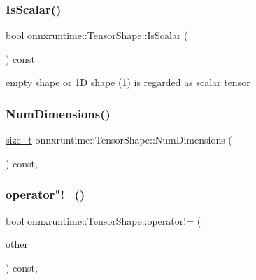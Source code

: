 \subsubsection{\texorpdfstring{Is\+Scalar()}{IsScalar()}}
{\footnotesize\ttfamily bool onnxruntime\+::\+Tensor\+Shape\+::\+Is\+Scalar (\begin{DoxyParamCaption}{ }\end{DoxyParamCaption}) const\hspace{0.3cm}{\ttfamily [inline]}}

empty shape or 1D shape (1) is regarded as scalar tensor \mbox{\label{classonnxruntime_1_1TensorShape_af9e40196654d3d161544789f61415c53}} 
\subsubsection{\texorpdfstring{Num\+Dimensions()}{NumDimensions()}}
{\footnotesize\ttfamily \mbox{\hyperlink{mlasi_8h_a503efbc1c6e50825320ad909366b78ab}{size\+\_\+t}} onnxruntime\+::\+Tensor\+Shape\+::\+Num\+Dimensions (\begin{DoxyParamCaption}{ }\end{DoxyParamCaption}) const\hspace{0.3cm}{\ttfamily [inline]}, {\ttfamily [noexcept]}}

\mbox{\label{classonnxruntime_1_1TensorShape_a5adff36f4e3efc2e2b337a2e78210256}} 
\subsubsection{\texorpdfstring{operator"!=()}{operator!=()}}
{\footnotesize\ttfamily bool onnxruntime\+::\+Tensor\+Shape\+::operator!= (\begin{DoxyParamCaption}\item[{const \mbox{\hyperlink{classonnxruntime_1_1TensorShape}{Tensor\+Shape}} \&}]{other }\end{DoxyParamCaption}) const\hspace{0.3cm}{\ttfamily [inline]}, {\ttfamily [noexcept]}}

